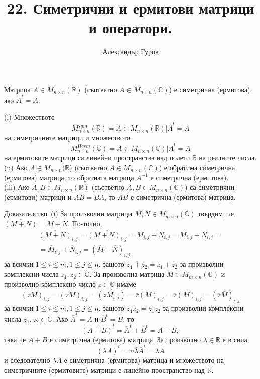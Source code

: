 \documentclass{article}
\title{22. Симетрични и ермитови матрици и оператори.}
\author{Александър Гуров}
\date{\datebulgarian{\today}}
\newcommand*{\bC}{\mathbb{C}}
\newcommand*{\bR}{\mathbb{R}}
\newcommand*{\mat}[2]{M_{{#1}\times {#2}}}
\newcommand{\dok}{\underline{Доказателство}\  }
\newcommand{\tvurdenie}[2]{
    \begin{tcolorbox}[title = #1 ,colframe = blue!70!black, colback = blue!10!white]
        #2
    \end{tcolorbox}
}
\newcommand{\opredelenie}[2]{
    \begin{tcolorbox}[title = #1 ,colframe = red!70!black, colback = red!10!white]
        #2
    \end{tcolorbox}
}
\begin{document}
\maketitle
\opredelenie{Определение 22.1}{
    Матрица $A \in M_{n\times n}(\mathbb{R})$
    (съответно $A \in M_{n\times n}(\mathbb{C})$) е симетрична (ермитова), ако $\overline{A}^t= A$.
}
\tvurdenie{Твърдение 22.2}{
(i) Множеството \[M^{sym}_{n\times n}(\mathbb{R}) = {A \in M_{n\times n}(\mathbb{R})| \overline{A}^t = A}\]
на симетричните матрици и множеството
\[M^{Herm}_{n\times n}(\mathbb{C}) = {A \in M_{n\times n}(\mathbb{C})| \overline{A}^t = A}\]
на ермитовите матрици са линейни пространства над полето $\mathbb{R}$ на
реалните числа.\\
(ii) Ако $A \in M_{n\times n}(\mathbb{R}$) (съответно $A \in M_{n\times n}(\mathbb{C})$) е
обратима симетрична (ермитова) матрица, то обратната матрица $A^{-1}$
е симетрична (ермитова).\\
(iii) Ако $A, B \in M_{n\times n}(\mathbb{R})$ (съответно $A, B \in M_{n\times n}(\mathbb{C})$)
са симетрични (ермитови) матрици и $AB = BA$, то $AB$ е симетрична (ермитова) матрица.
}
\dok (i) За произволни матрици $M, N \in M_{m\times n}(\mathbb{C})$ твърдим,
че $\overline{(M + N)} = \overline{M} + \overline{N}$. По-точно,
\begin{gather*}
    \overline{(M + N)}_{i,j}=\overline{(M+N)_{i,j}}=\overline{M_{i,j}+N_{i,j}}=\overline{M_{i,j}}+\overline{N_{i,j}}=\\
    =\overline{M}_{i,j}+\overline{N}_{i,j}=(\overline{M}+\overline{N})_{i,j}
\end{gather*}
за всички $1\leq i \leq m, 1\leq j \leq n$, защото $\overline{z_1+z_2}=\overline{z_1}+\overline{z_2}$
за произволни комплексни числа $z_1,z_2\in \bC$.
За произволна матрица $M\in \mat{m}{n}(\bC)$ и произволно комплексно число $z\in\bC$ имаме
\[
    \overline{(zM)}_{i,j}=\overline{(zM)_{i,j}}=\overline{(zM_{i,j})}=
    \overline{z}\overline{(M)_{i,j}}=\overline{z}\overline{(M)}_{i,j}=(\overline{z}\overline{M})_{i,j}
\]
за всички $1\leq i \leq m, 1\leq j \leq n$, защото $\overline{z_1z_2}=\overline{z_1}\overline{z_2}$
за произволни комплексни числа $z_1,z_2\in \bC$.
Ако $\overline{A}^t=A$ и $\overline{B}^t=B$, то
\[
    \overline{(A+B)}^t=\overline{A}^t+\overline{B}^t=A+B,
\]
така че $A+B$ е симетрична (ермитова) матрица. За произволно $\lambda\in\bR$ е в сила
\[
    \overline{(\lambda A)}^t=n\overline{\lambda}\overline{A}^t=\lambda A
\]
и следователно $\lambda A$ е симетрична (ермитова) матрица и множеството на симетричните
(ермитовите) матрици е линейно пространство над $\bR$.
\end{document}
